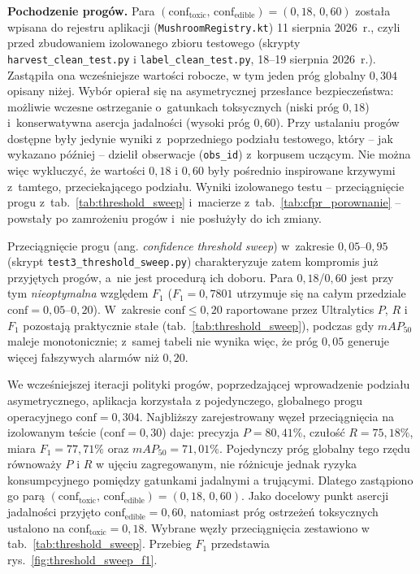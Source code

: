 \textbf{Pochodzenie progów.} Para $(\mathrm{conf}_{\mathrm{toxic}},\,\mathrm{conf}_{\mathrm{edible}})=(0{,}18,\,0{,}60)$ została wpisana do rejestru aplikacji (\texttt{MushroomRegistry.kt}) 11 sierpnia 2026~r., czyli przed zbudowaniem izolowanego zbioru testowego (skrypty \texttt{harvest\_clean\_test.py} i \texttt{label\_clean\_test.py}, 18--19 sierpnia 2026~r.). Zastąpiła ona wcześniejsze wartości robocze, w tym jeden próg globalny $0{,}304$ opisany niżej. Wybór opierał się na asymetrycznej przesłance bezpieczeństwa: możliwie wczesne ostrzeganie o~gatunkach toksycznych (niski próg $0{,}18$) i~konserwatywna asercja jadalności (wysoki próg $0{,}60$). Przy ustalaniu progów dostępne były jedynie wyniki z~poprzedniego podziału testowego, który -- jak wykazano później -- dzielił obserwacje (\texttt{obs\_id}) z~korpusem uczącym. Nie można więc wykluczyć, że wartości $0{,}18$ i $0{,}60$ były pośrednio inspirowane krzywymi z~tamtego, przeciekającego podziału. Wyniki izolowanego testu -- przeciągnięcie progu z~tab.~\ref{tab:threshold_sweep} i~macierze z~tab.~\ref{tab:cfpr_porownanie} -- powstały po zamrożeniu progów i~nie posłużyły do ich zmiany.

Przeciągnięcie progu (ang. \textit{confidence threshold sweep}) w~zakresie $0{,}05$--$0{,}95$ (skrypt \texttt{test3\_threshold\_sweep.py}) charakteryzuje zatem kompromis już przyjętych progów, a~nie jest procedurą ich doboru. Para $0{,}18$/$0{,}60$ jest przy tym \emph{nieoptymalna} względem $F_1$ ($F_1=0{,}7801$ utrzymuje się na całym przedziale $\mathrm{conf}=0{,}05$--$0{,}20$). W~zakresie $\mathrm{conf}\le 0{,}20$ raportowane przez Ultralytics $P$, $R$ i~$F_1$ pozostają praktycznie stałe (tab.~\ref{tab:threshold_sweep}), podczas gdy $mAP_{50}$ maleje monotonicznie; z~samej tabeli nie wynika więc, że próg $0{,}05$ generuje więcej fałszywych alarmów niż $0{,}20$.

We wcześniejszej iteracji polityki progów, poprzedzającej wprowadzenie podziału asymetrycznego, aplikacja korzystała z pojedynczego, globalnego progu operacyjnego $\mathrm{conf}=0{,}304$. Najbliższy zarejestrowany węzeł przeciągnięcia na izolowanym teście ($\mathrm{conf}=0{,}30$) daje: precyzja $P=80{,}41\%$, czułość $R=75{,}18\%$, miara $F_1=77{,}71\%$ oraz $mAP_{50}=71{,}01\%$. Pojedynczy próg globalny tego rzędu równoważy $P$ i $R$ w ujęciu zagregowanym, nie różnicuje jednak ryzyka konsumpcyjnego pomiędzy gatunkami jadalnymi a trującymi. Dlatego zastąpiono go parą $(\mathrm{conf}_{\mathrm{toxic}},\,\mathrm{conf}_{\mathrm{edible}})=(0{,}18,\,0{,}60)$. Jako docelowy punkt asercji jadalności przyjęto $\mathrm{conf}_{\mathrm{edible}}=0{,}60$, natomiast próg ostrzeżeń toksycznych ustalono na $\mathrm{conf}_{\mathrm{toxic}}=0{,}18$. Wybrane węzły przeciągnięcia zestawiono w tab.~\ref{tab:threshold_sweep}. Przebieg $F_1$ przedstawia rys.~\ref{fig:threshold_sweep_f1}.

